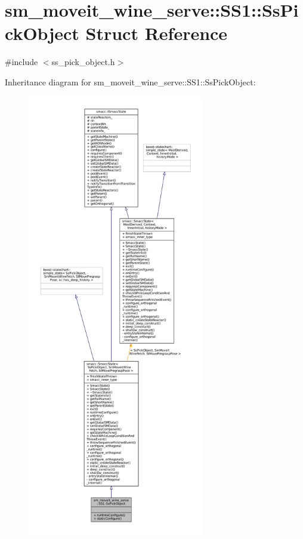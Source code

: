 \hypertarget{structsm__moveit__wine__serve_1_1SS1_1_1SsPickObject}{}\section{sm\+\_\+moveit\+\_\+wine\+\_\+serve\+:\+:S\+S1\+:\+:Ss\+Pick\+Object Struct Reference}
\label{structsm__moveit__wine__serve_1_1SS1_1_1SsPickObject}


{\ttfamily \#include $<$ss\+\_\+pick\+\_\+object.\+h$>$}



Inheritance diagram for sm\+\_\+moveit\+\_\+wine\+\_\+serve\+:\+:S\+S1\+:\+:Ss\+Pick\+Object\+:
\nopagebreak
\begin{figure}[H]
\begin{center}
\leavevmode
\includegraphics[height=550pt]{structsm__moveit__wine__serve_1_1SS1_1_1SsPickObject__inherit__graph}
\end{center}
\end{figure}


